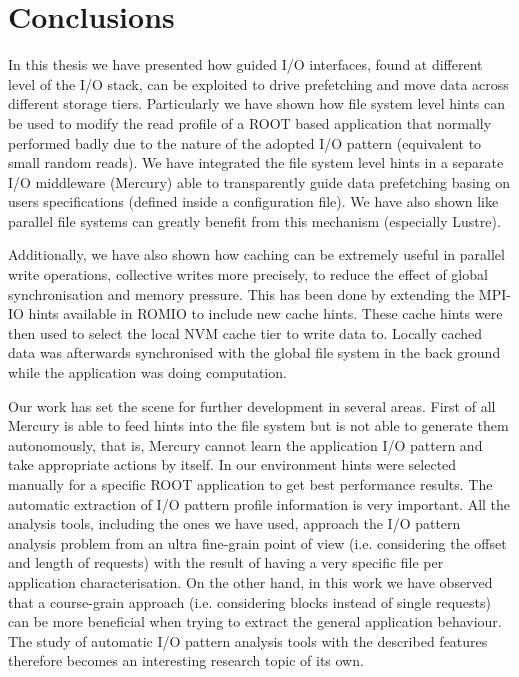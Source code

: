 \chapter{Conclusions}\label{chapter: conclusions}
In this thesis we have presented how guided I/O interfaces, found at different level of the I/O stack, can be exploited to drive prefetching and move data across different storage tiers. Particularly we have shown how file system level hints can be used to modify the read profile of a ROOT based application that normally performed badly due to the nature of the adopted I/O pattern (equivalent to small random reads). We have integrated the file system level hints in a separate I/O middleware (Mercury) able to transparently guide data prefetching basing on users specifications (defined inside a configuration file). We have also shown like parallel file systems can greatly benefit from this mechanism (especially Lustre).

Additionally, we have also shown how caching can be extremely useful in parallel write operations, collective writes more precisely, to reduce the effect of global synchronisation and memory pressure. This has been done by extending the MPI-IO hints available in ROMIO to include new cache hints. These cache hints were then used to select the local NVM cache tier to write data to. Locally cached data was afterwards synchronised with the global file system in the back ground while the application was doing computation.

Our work has set the scene for further development in several areas. First of all Mercury is able to feed hints into the file system but is not able to generate them autonomously, that is, Mercury cannot learn the application I/O pattern and take appropriate actions by itself. In our environment hints were selected manually for a specific ROOT application to get best performance results. The automatic extraction of I/O pattern profile information is very important. All the analysis tools, including the ones we have used, approach the I/O pattern analysis problem from an ultra fine-grain point of view (i.e. considering the offset and length of requests) with the result of having a very specific file per application characterisation. On the other hand, in this work we have observed that a course-grain approach (i.e. considering blocks instead of single requests) can be more beneficial when trying to extract the general application behaviour. The study of automatic I/O pattern analysis tools with the described features therefore becomes an interesting research topic of its own.

